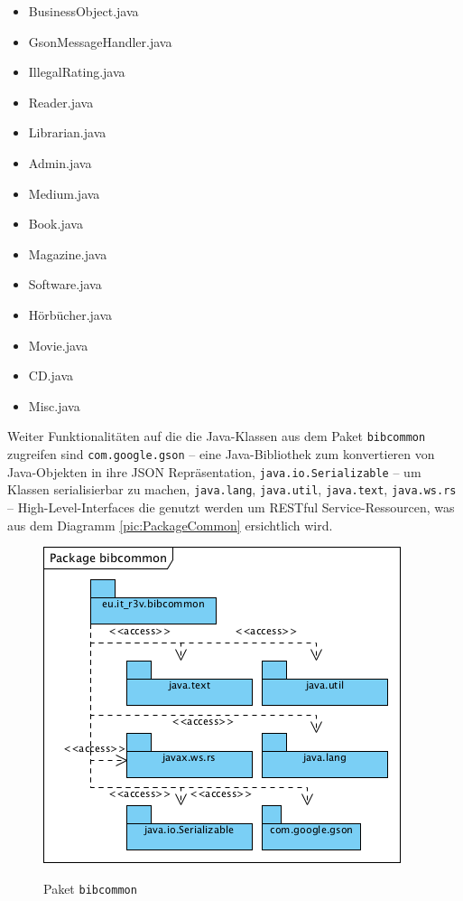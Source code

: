 \documentclass[fontsize=12pt,paper=a4,twoside]{scrartcl}
\begin{document}
\begin{itemize}
\item{BusinessObject.java}
\item{GsonMessageHandler.java}
\item{IllegalRating.java}
\item{Reader.java}
\item{Librarian.java}
\item{Admin.java}
\item{Medium.java}
\item{Book.java}
\item{Magazine.java}
\item{Software.java}
\item{Hörbücher.java}
\item{Movie.java}
\item{CD.java}
\item{Misc.java}
\end{itemize}

Weiter Funktionalitäten auf die die Java-Klassen aus dem Paket \texttt{bibcommon} zugreifen sind \texttt{com.google.gson} -- eine Java-Bibliothek zum konvertieren von Java-Objekten in ihre JSON Repräsentation, \texttt{java.io.Serializable} -- um Klassen serialisierbar zu machen, \texttt{java.lang}, \texttt{java.util}, \texttt{java.text}, \texttt{java.ws.rs} -- High-Level-Interfaces die genutzt werden um RESTful Service-Ressourcen, was aus dem Diagramm \vref{pic:PackageCommon} ersichtlich wird.

\begin{figure} [H] 
\caption{Paket \texttt{bibcommon}} \centering
 \includegraphics[scale=2]{Diagramme/Packagebibcommon.png} 
 \label{pic:PackageCommon} 
\end{figure}
\end{document}
